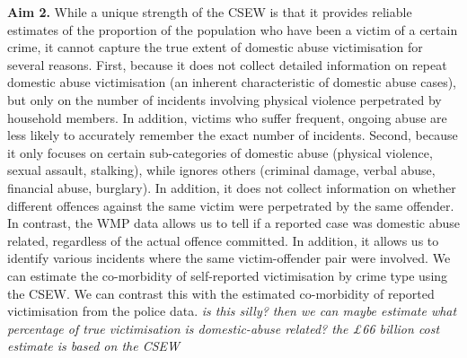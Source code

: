 \documentclass[11pt, a4paper]{article}
\begin{document}

\textbf{Aim 2.}  While a unique strength of the CSEW is that it provides reliable estimates of the proportion of the population who have been a victim of a certain crime, it cannot capture the true extent of domestic abuse victimisation for several reasons. First, because it does not collect detailed information on repeat domestic abuse victimisation (an inherent characteristic of domestic abuse cases), but only on the number of incidents involving physical violence perpetrated by household members. In addition, victims who suffer frequent, ongoing abuse are less likely to accurately remember the exact number of incidents. Second, because it only focuses on certain sub-categories of domestic abuse (physical violence, sexual assault, stalking), while ignores others (criminal damage, verbal abuse, financial abuse, burglary). In addition, it does not collect information on whether different offences against the same victim were perpetrated by the same offender. In contrast, the WMP data allows us to tell if a reported case was domestic abuse related, regardless of the actual offence committed. In addition, it allows us to identify various incidents where the same victim-offender pair were involved. We can estimate the co-morbidity of self-reported victimisation by crime type using the CSEW. We can contrast this with the estimated co-morbidity of reported victimisation from the police data. \textit{is this silly? then we can maybe estimate what percentage of true victimisation is domestic-abuse related? the £66 billion cost estimate is based on the CSEW}


\end{document}
